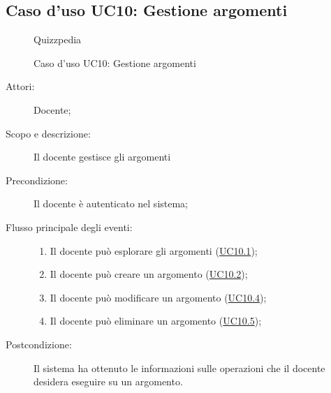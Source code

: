 \subsection{Caso d'uso UC10: Gestione argomenti}
        \begin{figure}[H]
            \centering
            \begin{resizedtikzpicture}{\textwidth}
		\begin{umlsystem}[x=0, fill=lightgray!20]{Quizzpedia}
		\end{umlsystem}
            \end{resizedtikzpicture}
            \caption{Caso d'uso UC10: Gestione argomenti}
            \label{fig:UC10} 
        \end{figure}
    \begin{description}
\item[Attori:] Docente;
\item[Scopo e descrizione:] Il docente gestisce gli argomenti
      \item[Precondizione:] Il docente è autenticato nel sistema;

        \item[Flusso principale degli eventi:] \begin{enumerate}
          \item Il docente può esplorare gli argomenti (\hyperlink{UC10.1}{UC10.1});
          \item Il docente può creare un argomento (\hyperlink{UC10.2}{UC10.2});
          \item Il docente può modificare un argomento (\hyperlink{UC10.4}{UC10.4});
          \item Il docente può eliminare un argomento (\hyperlink{UC10.5}{UC10.5});

      \end{enumerate}
    \item[Postcondizione:] Il sistema ha ottenuto le informazioni sulle operazioni che il docente desidera eseguire su un argomento.
  \end{description}
\hypertarget{UC10.1}{}
